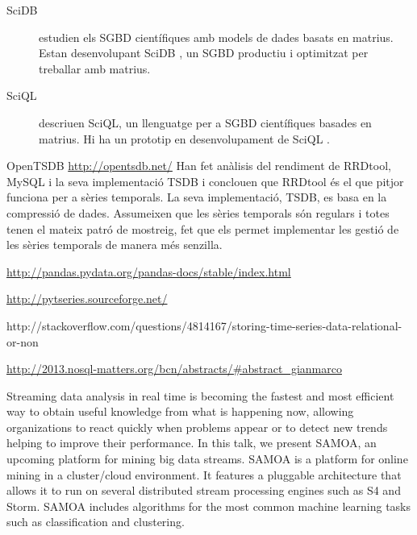 \begin{description}
\item[SciDB]
\textcite{stonebraker09:scidb} estudien els SGBD científiques amb models  de dades basats en matrius. Estan desenvolupant SciDB \parencite{scidb}, un SGBD productiu i optimitzat per treballar amb matrius.


\item[SciQL]
\textcite{kersten11} descriuen SciQL, un llenguatge per a SGBD científiques basades en matrius. Hi ha un prototip en desenvolupament de SciQL \parencite{sciql}.


\end{description}




\todo{}


OpenTSDB \cite{deri12:tsdb_compressed_database}
\url{http://opentsdb.net/}
Han fet anàlisis del rendiment de RRDtool, MySQL i la seva implementació TSDB i conclouen que RRDtool és el que pitjor funciona per a sèries temporals. La seva implementació, TSDB, es basa en la compressió de dades. Assumeixen que les sèries temporals són regulars i totes tenen el mateix patró de mostreig, fet que els permet implementar les gestió de les sèries temporals de manera més senzilla.




\url{http://pandas.pydata.org/pandas-docs/stable/index.html}

\url{http://pytseries.sourceforge.net/}



http://stackoverflow.com/questions/4814167/storing-time-series-data-relational-or-non



\url{http://2013.nosql-matters.org/bcn/abstracts/#abstract_gianmarco}

Streaming data analysis in real time is becoming the fastest and most efficient way to obtain useful knowledge from what is happening now, allowing organizations to react quickly when problems appear or to detect new trends helping to improve their performance. In this talk, we present SAMOA, an upcoming platform for mining big data streams. SAMOA is a platform for online mining in a cluster/cloud environment. It features a pluggable architecture that allows it to run on several distributed stream processing engines such as S4 and Storm. SAMOA includes algorithms for the most common machine learning tasks such as classification and clustering. 






